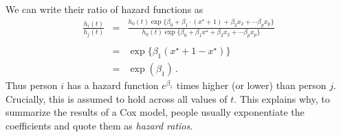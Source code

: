 \documentclass[11pt]{article}
\newcommand{\1}[1]{\mathbf{1}_{\{ {#1} \}}}
\begin{document}
We can write their ratio of hazard functions as
\begin{eqnarray*}
\frac{h_i(t)}{h_j(t)} &=& \frac{ h_0(t) \exp\{ \beta_0 + \beta_1 \cdot (x^{\star} + 1) + \beta_2 x_2 + \cdots \beta_p x_p \} } {h_0(t)  \exp\{ \beta_0 + \beta_1 x^\star + \beta_2 x_2 + \cdots \beta_p x_p \} } \\
\\
&=& \exp\{ \beta_1 (x^{\star} + 1 - x^\star) \} \\
&=& \exp (\beta_1) \, .
\end{eqnarray*}
Thus person $i$ has a hazard function $e^{\beta_1}$ times higher (or lower) than person $j$.  Crucially, this is assumed to hold across all values of $t$.  This explains why, to summarize the results of a Cox model, people usually exponentiate the coefficients and quote them as \textit{hazard ratios}.
\end{document}
